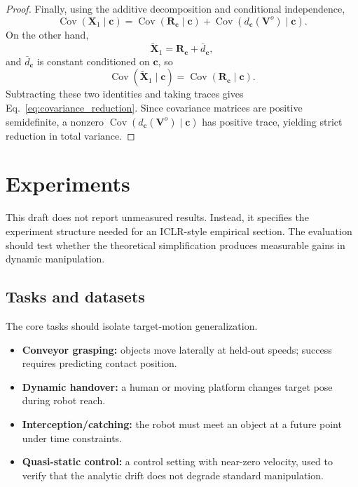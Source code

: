 \documentclass{article} %
\begin{document}
\begin{proof}
Finally, using the additive decomposition and conditional independence,
\[
    \operatorname{Cov}
    (
        \mathbf X_1
        \mid
        \mathbf c
    )
    =
    \operatorname{Cov}
    (
        \mathbf R_{\mathbf c}
        \mid
        \mathbf c
    )
    +
    \operatorname{Cov}
    (
        d_{\mathbf c}(\mathbf V^{o})
        \mid
        \mathbf c
    ).
\]
On the other hand,
\[
    \widetilde{\mathbf X}_1
    =
    \mathbf R_{\mathbf c}
    +
    \bar d_{\mathbf c},
\]
and $\bar d_{\mathbf c}$ is constant conditioned on $\mathbf c$, so
\[
    \operatorname{Cov}
    (
        \widetilde{\mathbf X}_1
        \mid
        \mathbf c
    )
    =
    \operatorname{Cov}
    (
        \mathbf R_{\mathbf c}
        \mid
        \mathbf c
    ).
\]
Subtracting these two identities and taking traces gives
Eq.~\eqref{eq:covariance_reduction}. Since covariance matrices are positive
semidefinite, a nonzero
$\operatorname{Cov}(d_{\mathbf c}(\mathbf V^{o})\mid\mathbf c)$ has positive
trace, yielding strict reduction in total variance.
\end{proof}


\section{Experiments}
\label{sec:experiments}

This draft does not report unmeasured results. Instead, it specifies the experiment structure needed for an ICLR-style empirical section. The evaluation should test whether the theoretical simplification produces measurable gains in dynamic manipulation.

\subsection{Tasks and datasets}

The core tasks should isolate target-motion generalization.
\begin{itemize}
    \item \textbf{Conveyor grasping:} objects move laterally at held-out speeds; success requires predicting contact position.
    \item \textbf{Dynamic handover:} a human or moving platform changes target pose during robot reach.
    \item \textbf{Interception/catching:} the robot must meet an object at a future point under time constraints.
    \item \textbf{Quasi-static control:} a control setting with near-zero velocity, used to verify that the analytic drift does not degrade standard manipulation.
\end{itemize}
\end{document}
